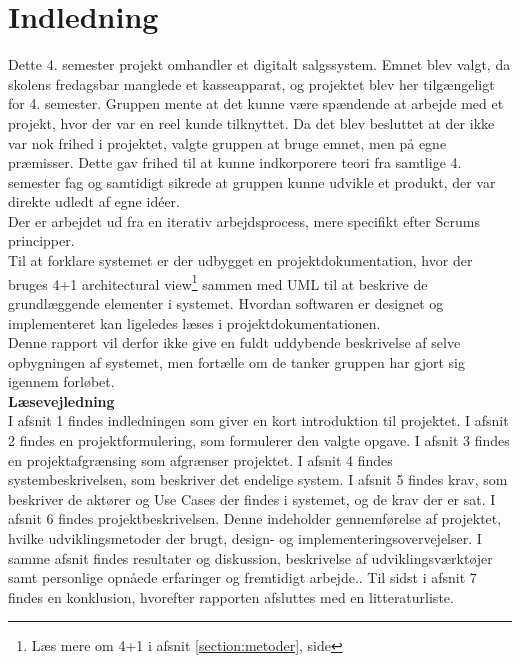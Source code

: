 \chapter{Indledning}
Dette 4. semester projekt omhandler et digitalt salgssystem. Emnet blev valgt, da skolens fredagsbar manglede et kasseapparat, og projektet blev her tilgængeligt for 4. semester. Gruppen mente at det kunne være spændende at arbejde med et projekt, hvor der var en reel kunde tilknyttet. Da det blev besluttet at der ikke var nok frihed i projektet, valgte gruppen at bruge emnet, men på egne præmisser. Dette gav frihed til at kunne indkorporere teori fra samtlige 4. semester fag og samtidigt sikrede at gruppen kunne udvikle et produkt, der var direkte udledt af egne idéer.\\

Der er arbejdet ud fra en iterativ arbejdsprocess, mere specifikt efter Scrums principper.\\

Til at forklare systemet er der udbygget en projektdokumentation, hvor der bruges 4+1 architectural view\footnote{Læs mere om 4+1 i afsnit \ref{section:metoder}, side \pageref{section:metoder}} sammen med UML til at beskrive de grundlæggende elementer i systemet. Hvordan softwaren er designet og implementeret kan ligeledes læses i projektdokumentationen.\\
Denne rapport vil derfor ikke give en fuldt uddybende beskrivelse af selve opbygningen af systemet, men fortælle om de tanker gruppen har gjort sig igennem forløbet.\\

\textbf{Læsevejledning}\\
I afsnit 1 findes indledningen som giver en kort introduktion til projektet. I afsnit 2 findes en projektformulering, som formulerer den valgte opgave. I afsnit 3 findes en projektafgrænsing som afgrænser projektet. I afsnit 4 findes systembeskrivelsen, som beskriver det endelige system. I afsnit 5 findes krav, som beskriver de aktører og Use Cases der findes i systemet, og de krav der er sat.
I afsnit 6 findes projektbeskrivelsen. Denne indeholder gennemførelse af projektet, hvilke udviklingsmetoder der brugt, design- og implementeringsovervejelser. I samme afsnit findes resultater og diskussion, beskrivelse af udviklingsværktøjer samt personlige opnåede erfaringer og fremtidigt arbejde.. Til sidst i afsnit 7 findes en konklusion, hvorefter rapporten afsluttes med en litteraturliste.